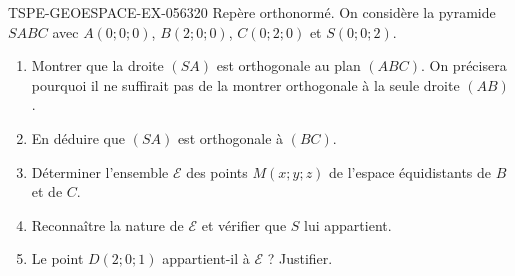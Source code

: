 \begin{exercice}{TSPE-GEOESPACE-EX-056}{3}{20}
Repère orthonormé. On considère la pyramide $SABC$ avec
$A(0;0;0)$, $B(2;0;0)$, $C(0;2;0)$ et $S(0;0;2)$.
\begin{enumerate}
  \item Montrer que la droite $(SA)$ est orthogonale au plan $(ABC)$. On
        précisera pourquoi il ne suffirait pas de la montrer orthogonale à la
        seule droite $(AB)$.
  \item En déduire que $(SA)$ est orthogonale à $(BC)$.
  \item Déterminer l'ensemble $\mathcal{E}$ des points $M(x;y;z)$ de l'espace
        équidistants de $B$ et de $C$.
  \item Reconnaître la nature de $\mathcal{E}$ et vérifier que $S$ lui
        appartient.
  \item Le point $D(2;0;1)$ appartient-il à $\mathcal{E}$ ? Justifier.
\end{enumerate}
\end{exercice}
